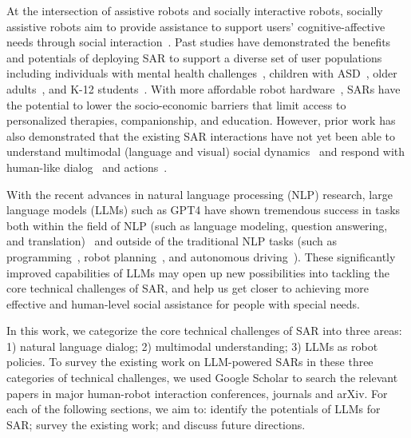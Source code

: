 \documentclass[
twocolumn,
]{ceurart}
\begin{document}
At the intersection of assistive robots and socially interactive robots, socially assistive robots aim to provide assistance to support users' cognitive-affective needs through social interaction~\cite{feil2011socially}. Past studies have demonstrated the benefits and potentials of deploying SAR to support a diverse set of user populations including individuals with mental health challenges~\cite{scoglio2019use}, children with ASD~\cite{cabibihan2013robots}, older adults~\cite{shishehgar2018systematic}, and K-12 students~\cite{randall2019survey}. With more affordable robot hardware~\cite{koh2021impacts, pinto2022physical, koh2022usability}, SARs have the potential to lower the socio-economic barriers that limit access to personalized therapies, companionship, and education. 
However, prior work has also demonstrated that the existing SAR interactions have not yet been able to understand multimodal (language and visual) social dynamics~\cite{robinson2023robotic, li2021intention} and respond with human-like dialog~\cite{skantze2021turn} and actions~\cite{akalin2021reinforcement}.

With the recent advances in natural language processing (NLP) research, large language models (LLMs) such as GPT4 have shown tremendous success in tasks both within the field of NLP (such as language modeling, question answering, and translation)~\cite{achiam2023gpt} and outside of the traditional NLP tasks (such as programming~\cite{xu2022systematic}, robot planning~\cite{singh2023progprompt}, and autonomous driving~\cite{cui2024survey}). These significantly improved capabilities of LLMs may open up new possibilities into tackling the core technical challenges of SAR, and help us get closer to achieving more effective and human-level social assistance for people with special needs.

In this work, we categorize the core technical challenges of SAR into three areas: 1) natural language dialog; 2) multimodal understanding; 3) LLMs as robot policies. To survey the existing work on LLM-powered SARs in these three categories of technical challenges, we used Google Scholar to search the relevant papers in major human-robot interaction conferences, journals and arXiv. For each of the following sections, we aim to: identify the potentials of LLMs for SAR; survey the existing work; and discuss future directions.
\end{document}
